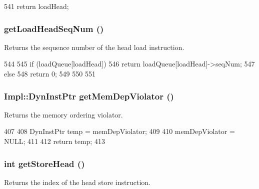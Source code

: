 \begin{DoxyCode}
541 { return loadHead; }
\end{DoxyCode}
\hypertarget{classLSQUnit_aee7352adadc6b43b7ce36a8c052eb222}{
\subsubsection[{getLoadHeadSeqNum}]{ getLoadHeadSeqNum ()}}
\label{classLSQUnit_aee7352adadc6b43b7ce36a8c052eb222}
Returns the sequence number of the head load instruction. 


\begin{DoxyCode}
544     {
545         if (loadQueue[loadHead]) {
546             return loadQueue[loadHead]->seqNum;
547         } else {
548             return 0;
549         }
550 
551     }
\end{DoxyCode}
\hypertarget{classLSQUnit_a30adaf6f5fb6b38b5747f35c419e3f31}{
\subsubsection[{getMemDepViolator}]{\setlength{\rightskip}{0pt plus 5cm}Impl::DynInstPtr getMemDepViolator ()}}
\label{classLSQUnit_a30adaf6f5fb6b38b5747f35c419e3f31}
Returns the memory ordering violator. 


\begin{DoxyCode}
407 {
408     DynInstPtr temp = memDepViolator;
409 
410     memDepViolator = NULL;
411 
412     return temp;
413 }
\end{DoxyCode}
\hypertarget{classLSQUnit_ab9d14b0deb8ab44dc09ac784b162e774}{
\subsubsection[{getStoreHead}]{\setlength{\rightskip}{0pt plus 5cm}int getStoreHead ()}}
\label{classLSQUnit_ab9d14b0deb8ab44dc09ac784b162e774}
Returns the index of the head store instruction. 


